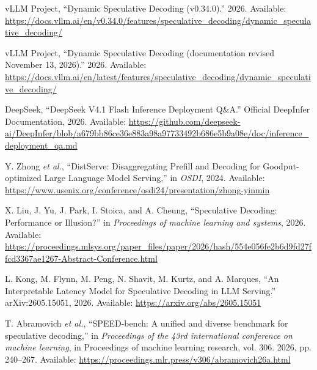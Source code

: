 \documentclass[11pt,a4paper,UTF8,fontset=none,scheme=plain,zihao=-4]{ctexart}
\newenvironment{CSLReferences}[2]{%
  \footnotesize
  \raggedright
  \setlength{\leftskip}{3em}%
  \setlength{\parindent}{-3em}%
  \setlength{\parskip}{0.1\baselineskip}%
  \sloppy
}{}
\newcommand{\CSLLeftMargin}[1]{\makebox[3em][l]{#1}}
\newcommand{\CSLRightInline}[1]{#1}
\begin{document}
\begin{CSLReferences}{0}{0}
\leavevmode{}%
\CSLLeftMargin{{[}83{]} }
\CSLRightInline{vLLM Project, {``{Dynamic Speculative Decoding
(v0.34.0)}.''} 2026. Available:
\url{https://docs.vllm.ai/en/v0.34.0/features/speculative_decoding/dynamic_speculative_decoding/}}

\leavevmode{}%
\CSLLeftMargin{{[}84{]} }
\CSLRightInline{vLLM Project, {``{Dynamic Speculative Decoding
(documentation revised November 13, 2026)}.''} 2026. Available:
\url{https://docs.vllm.ai/en/latest/features/speculative_decoding/dynamic_speculative_decoding/}}

\leavevmode{}%
\CSLLeftMargin{{[}85{]} }
\CSLRightInline{DeepSeek, {``{DeepSeek V4.1 Flash Inference Deployment
Q\&A}.''} Official DeepInfer Documentation, 2026. Available:
\url{https://github.com/deepseek-ai/DeepInfer/blob/a679bb86ce36e883a98a97733492b686e5b9a08e/doc/inference_deployment_qa.md}}

\leavevmode{}%
\CSLLeftMargin{{[}86{]} }
\CSLRightInline{Y. Zhong \emph{et al.}, {``{DistServe: Disaggregating
Prefill and Decoding for Goodput-optimized Large Language Model
Serving},''} in \emph{OSDI}, 2024. Available:
\url{https://www.usenix.org/conference/osdi24/presentation/zhong-yinmin}}

\leavevmode{}%
\CSLLeftMargin{{[}87{]} }
\CSLRightInline{X. Liu, J. Yu, J. Park, I. Stoica, and A. Cheung,
{``{Speculative Decoding: Performance or Illusion?}''} in
\emph{Proceedings of machine learning and systems}, 2026. Available:
\url{https://proceedings.mlsys.org/paper_files/paper/2026/hash/554e056fe2b6d9fd27ffcd3367ae1267-Abstract-Conference.html}}

\leavevmode{}%
\CSLLeftMargin{{[}88{]} }
\CSLRightInline{L. Kong, M. Flynn, M. Peng, N. Shavit, M. Kurtz, and A.
Marques, {``{An Interpretable Latency Model for Speculative Decoding in
LLM Serving}.''} arXiv:2605.15051, 2026. Available:
\url{https://arxiv.org/abs/2605.15051}}

\leavevmode{}%
\CSLLeftMargin{{[}89{]} }
\CSLRightInline{T. Abramovich \emph{et al.}, {``{SPEED}-bench: A unified
and diverse benchmark for speculative decoding,''} in \emph{Proceedings
of the 43rd international conference on machine learning}, in
Proceedings of machine learning research, vol. 306. 2026, pp. 240--267.
Available: \url{https://proceedings.mlr.press/v306/abramovich26a.html}}

\end{CSLReferences}
\end{document}
